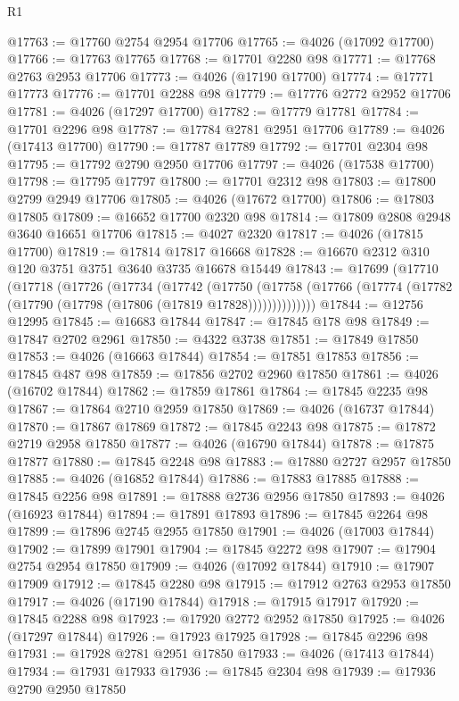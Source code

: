 \begin{lexlean}{R1}
\begin{coremodule}
@17763 := @17760 @2754 @2954 @17706
@17765 := @4026 (@17092 @17700)
@17766 := @17763 @17765
@17768 := @17701 @2280 @98
@17771 := @17768 @2763 @2953 @17706
@17773 := @4026 (@17190 @17700)
@17774 := @17771 @17773
@17776 := @17701 @2288 @98
@17779 := @17776 @2772 @2952 @17706
@17781 := @4026 (@17297 @17700)
@17782 := @17779 @17781
@17784 := @17701 @2296 @98
@17787 := @17784 @2781 @2951 @17706
@17789 := @4026 (@17413 @17700)
@17790 := @17787 @17789
@17792 := @17701 @2304 @98
@17795 := @17792 @2790 @2950 @17706
@17797 := @4026 (@17538 @17700)
@17798 := @17795 @17797
@17800 := @17701 @2312 @98
@17803 := @17800 @2799 @2949 @17706
@17805 := @4026 (@17672 @17700)
@17806 := @17803 @17805
@17809 := @16652 @17700 @2320 @98
@17814 := @17809 @2808 @2948 @3640 @16651 @17706
@17815 := @4027 @2320
@17817 := @4026 (@17815 @17700)
@17819 := @17814 @17817 @16668
@17828 := @16670 @2312 @310 @120 @3751 @3751 @3640 @3735 @16678 @15449
@17843 := @17699
    (@17710
      (@17718
        (@17726
          (@17734
            (@17742
              (@17750
                (@17758 (@17766 (@17774 (@17782 (@17790 (@17798 (@17806 (@17819 @17828))))))))))))))
@17844 := @12756 @12995
@17845 := @16683 @17844
@17847 := @17845 @178 @98
@17849 := @17847 @2702 @2961
@17850 := @4322 @3738
@17851 := @17849 @17850
@17853 := @4026 (@16663 @17844)
@17854 := @17851 @17853
@17856 := @17845 @487 @98
@17859 := @17856 @2702 @2960 @17850
@17861 := @4026 (@16702 @17844)
@17862 := @17859 @17861
@17864 := @17845 @2235 @98
@17867 := @17864 @2710 @2959 @17850
@17869 := @4026 (@16737 @17844)
@17870 := @17867 @17869
@17872 := @17845 @2243 @98
@17875 := @17872 @2719 @2958 @17850
@17877 := @4026 (@16790 @17844)
@17878 := @17875 @17877
@17880 := @17845 @2248 @98
@17883 := @17880 @2727 @2957 @17850
@17885 := @4026 (@16852 @17844)
@17886 := @17883 @17885
@17888 := @17845 @2256 @98
@17891 := @17888 @2736 @2956 @17850
@17893 := @4026 (@16923 @17844)
@17894 := @17891 @17893
@17896 := @17845 @2264 @98
@17899 := @17896 @2745 @2955 @17850
@17901 := @4026 (@17003 @17844)
@17902 := @17899 @17901
@17904 := @17845 @2272 @98
@17907 := @17904 @2754 @2954 @17850
@17909 := @4026 (@17092 @17844)
@17910 := @17907 @17909
@17912 := @17845 @2280 @98
@17915 := @17912 @2763 @2953 @17850
@17917 := @4026 (@17190 @17844)
@17918 := @17915 @17917
@17920 := @17845 @2288 @98
@17923 := @17920 @2772 @2952 @17850
@17925 := @4026 (@17297 @17844)
@17926 := @17923 @17925
@17928 := @17845 @2296 @98
@17931 := @17928 @2781 @2951 @17850
@17933 := @4026 (@17413 @17844)
@17934 := @17931 @17933
@17936 := @17845 @2304 @98
@17939 := @17936 @2790 @2950 @17850

\end{coremodule}
\end{lexlean}
